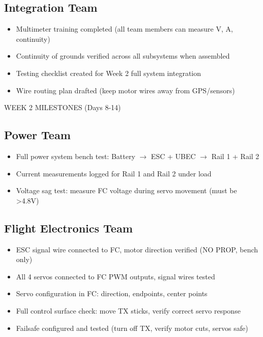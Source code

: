 \documentclass[11pt,letterpaper]{article}
\begin{document}
{\subsection{Integration Team}

\begin{itemize}
  \item Multimeter training completed (all team members can measure V, A, continuity)
  \item Continuity of grounds verified across all subsystems when assembled
  \item Testing checklist created for Week 2 full system integration
  \item Wire routing plan drafted (keep motor wires away from GPS/sensors)
\end{itemize}

WEEK 2 MILESTONES (Days 8-14)\par

\subsection{Power Team}

\begin{itemize}
  \item Full power system bench test: Battery $\rightarrow$ ESC + UBEC $\rightarrow$ Rail 1 + Rail 2
  \item Current measurements logged for Rail 1 and Rail 2 under load
  \item Voltage sag test: measure FC voltage during servo movement (must be >4.8V)
\end{itemize}

\subsection{Flight Electronics Team}

\begin{itemize}
  \item ESC signal wire connected to FC, motor direction verified (NO PROP, bench only)
  \item All 4 servos connected to FC PWM outputs, signal wires tested
  \item Servo configuration in FC: direction, endpoints, center points
  \item Full control surface check: move TX sticks, verify correct servo response
  \item Failsafe configured and tested (turn off TX, verify motor cuts, servos safe)
\end{itemize}

}
\end{document}
